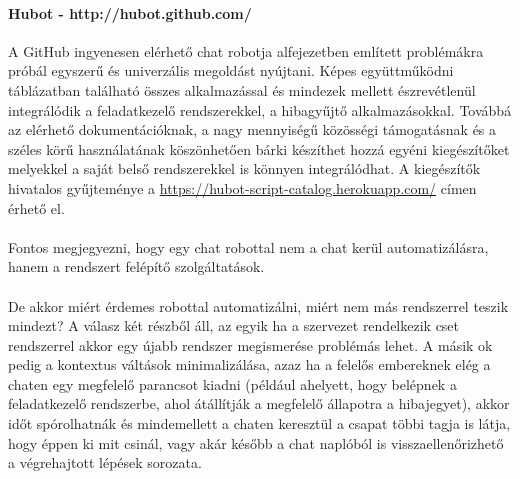 \paragraph{Hubot - http://hubot.github.com/} A GitHub ingyenesen elérhető chat robotja  alfejezetben említett problémákra próbál egyszerű és univerzális megoldást nyújtani. Képes együttműködni  táblázatban található összes alkalmazással és mindezek mellett észrevétlenül integrálódik a feladatkezelő rendszerekkel, a hibagyűjtő alkalmazásokkal. Továbbá az elérhető dokumentációknak, a nagy mennyiségű közösségi támogatásnak és a széles körű használatának köszönhetően bárki készíthet hozzá egyéni kiegészítőket melyekkel a saját belső rendszerekkel is könnyen integrálódhat. A kiegészítők hivatalos gyűjteménye a \url{https://hubot-script-catalog.herokuapp.com/} címen érhető el.\\
\hfill\\
Fontos megjegyezni, hogy egy chat robottal nem a chat kerül automatizálásra, hanem a rendszert felépítő szolgáltatások.\\
\hfill\\
De akkor miért érdemes robottal automatizálni, miért nem más rendszerrel teszik mindezt? A válasz két részből áll, az egyik ha a szervezet rendelkezik cset rendszerrel akkor egy újabb rendszer megismerése problémás lehet. A másik ok pedig a kontextus váltások minimalizálása, azaz ha a felelős embereknek elég a chaten egy megfelelő parancsot kiadni (például ahelyett, hogy belépnek a feladatkezelő rendszerbe, ahol átállítják a megfelelő állapotra a hibajegyet), akkor időt spórolhatnák és mindemellett a chaten keresztül a csapat többi tagja is látja, hogy éppen ki mit csinál, vagy akár később a chat naplóból is visszaellenőrizhető a végrehajtott lépések sorozata.